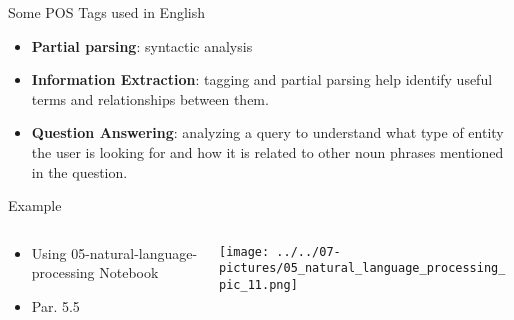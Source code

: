 \documentclass[11pt]{beamer}
\begin{document}
\begin{frame}{Some POS Tags used in English}
	\begin{itemize}
		\item \textbf{Partial parsing}: syntactic analysis
		\item \textbf{ Information Extraction}: tagging and partial parsing help identify useful terms and relationships between them.
		\item \textbf{ Question Answering}: analyzing a query to understand what type of entity the user is looking for and how it is related to other noun phrases mentioned in the question.
	\end{itemize}
\end{frame}
\begin{frame}{Example}
\begin{columns}[T] %
\begin{column}{.48\textwidth}
        \begin{itemize}
		\item Using 05-natural-language-processing Notebook 
		\item Par. 5.5
        \end{itemize}
\end{column}%
\hfill%
\begin{column}{.48\textwidth}
        \texttt{[image: ../../07-pictures/05\_natural\_language\_processing\_pic\_11.png]}
\end{column}%
\end{columns}
\end{frame}
\end{document}
